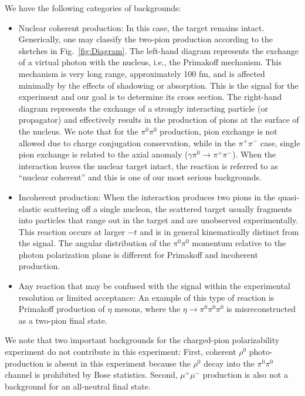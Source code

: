 We have the following categories of backgrounds:
\begin{itemize}
\item Nuclear coherent production: In this case, the target remains
  intact. Generically, one may classify the two-pion production
  according to the sketches in Fig.~\ref{fig:Diagram}. The left-hand
  diagram represents the exchange of a virtual photon with the
  nucleus, i.e., the Primakoff mechanism. This mechanism is very long
  range, approximately 100 fm, and is affected minimally by the
  effects of shadowing or absorption.  This is the signal for the
  experiment and our goal is to determine its cross section.  The
  right-hand diagram represents the exchange of a strongly interacting
  particle (or propagator) and effectively results in the production
  of pions at the surface of the nucleus. We note that for the
  $\pi^0\pi^0$ production, pion exchange is not allowed due to charge
  conjugation conservation, while in the $\pi^+\pi^-$ case, single
  pion exchange is related to the axial anomaly ($\gamma \pi^0
  \rightarrow \pi^+ \pi^-$).  When the interaction leaves the nuclear
  target intact, the reaction is referred to as ``nuclear coherent''
  and this is one of our most serious backgrounds.
\item Incoherent production: When the interaction produces two pions
  in the quasi-elastic scattering off a single nucleon, the scattered
  target usually fragments into particles that range out in the target
  and are unobserved experimentally. This reaction occurs at larger
  $-t$ and is in general kinematically distinct from the signal. The
  angular distribution of the $\pi^0\pi^0$ momentum relative to the
  photon polarization plane is different for Primakoff and incoherent
  production.
\item Any reaction that may be confused with the signal within the
  experimental resolution or limited acceptance: An example of this
  type of reaction is Primakoff production of $\eta$ mesons, where the
  $\eta\rightarrow \pi^0 \pi^0 \pi^0$ is misreconstructed as a
  two-pion final state.
\end{itemize}

We note that two important backgrounds for the charged-pion
polarizability experiment do not contribute in this experiment: First,
coherent $\rho^0$ photo-production is absent in this experiment
because the $\rho^0$ decay into the $\pi^0\pi^0$ channel is prohibited
by Bose statistics.  Second, $\mu^+\mu^-$ production is also not a
background for an all-neutral final state.

